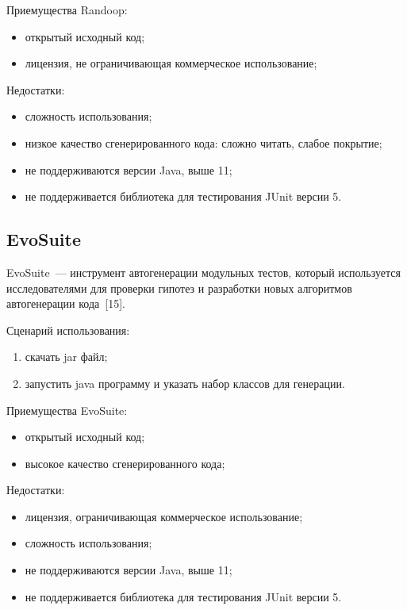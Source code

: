Приемущества Randoop: 

\begin{itemize}
	\item открытый исходный код;
	\item лицензия, не ограничивающая коммерческое использование;
\end{itemize}

Недостатки:

\begin{itemize}
	\item сложность использования;
	\item низкое качество сгенерированного кода: сложно читать, слабое покрытие;
	\item не поддерживаются версии Java, выше 11;
	\item не поддерживается библиотека для тестирования JUnit версии 5.
\end{itemize}

\subsection{EvoSuite}

EvoSuite~--- инструмент автогенерации модульных тестов, который используется исследователями для проверки 
гипотез и разработки новых алгоритмов автогенерации кода~[15].

Сценарий использования: 

\begin{enumerate}
	\item скачать jar файл;
	\item запустить java программу и указать набор классов для генерации.
\end{enumerate}

Приемущества EvoSuite: 

\begin{itemize}
	\item открытый исходный код;
	\item высокое качество сгенерированного кода;
\end{itemize}

Недостатки:

\begin{itemize}
	\item лицензия, ограничивающая коммерческое использование;
	\item сложность использования;
	\item не поддерживаются версии Java, выше 11;
	\item не поддерживается библиотека для тестирования JUnit версии 5.
\end{itemize}

